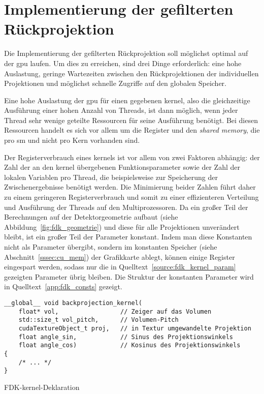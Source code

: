 \section{Implementierung der gefilterten Rückprojektion}

Die Implementierung der gefilterten Rückprojektion soll möglichst optimal auf der \gls{gpu} laufen. Um dies zu
erreichen, sind drei Dinge erforderlich: eine hohe Auslastung, geringe Wartezeiten zwischen den Rückprojektionen
der individuellen Projektionen und möglichst schnelle Zugriffe auf den globalen Speicher.

Eine hohe Auslastung der \gls{gpu} für einen gegebenen \gls{kernel}, also die gleichzeitige Ausführung einer hohen
Anzahl von Threads, ist dann möglich, wenn jeder Thread sehr wenige geteilte Ressourcen für seine Ausführung benötigt.
Bei diesen Ressourcen handelt es sich vor allem um die Register und den \textit{shared memory}, die pro \gls{sm} und
nicht pro Kern vorhanden sind.

Der Registerverbrauch eines \gls{kernel}s ist vor allem von zwei Faktoren abhängig: der Zahl der an den \gls{kernel}
übergebenen Funktionsparameter sowie der Zahl der lokalen Variablen pro Thread, die beispielsweise zur Speicherung der
Zwischenergebnisse benötigt werden. Die Minimierung beider Zahlen führt daher zu einem geringeren Registerverbrauch und
somit zu einer effizienteren Verteilung und Ausführung der Threads auf den Multiprozessoren. Da ein großer Teil der
Berechnungen auf der Detektorgeometrie aufbaut (siehe Abbildung~\ref{fig:fdk_geometrie}) und diese für alle Projektionen
unverändert bleibt, ist ein großer Teil der Parameter konstant. Indem man diese Konstanten nicht als Parameter übergibt,
sondern im konstanten Speicher (siehe Abschnitt~\ref{sssec:cu_mem}) der Grafikkarte ablegt, können einige Register
eingespart werden, sodass nur die in Quelltext~\ref{source:fdk_kernel_param} gezeigten Parameter übrig bleiben. Die
Struktur der konstanten Parameter wird in Quelltext~\ref{app:fdk_consts} gezeigt.

\begin{code}
\begin{verbatim}
__global__ void backprojection_kernel(
    float* vol,                 // Zeiger auf das Volumen
    std::size_t vol_pitch,      // Volumen-Pitch
    cudaTextureObject_t proj,   // in Textur umgewandelte Projektion
    float angle_sin,            // Sinus des Projektionswinkels
    float angle_cos)            // Kosinus des Projektionswinkels
{
    /* ... */
}
\end{verbatim}
\caption{FDK-\gls{kernel}-Deklaration}
\label{source:fdk_kernel_param}
\end{code}

